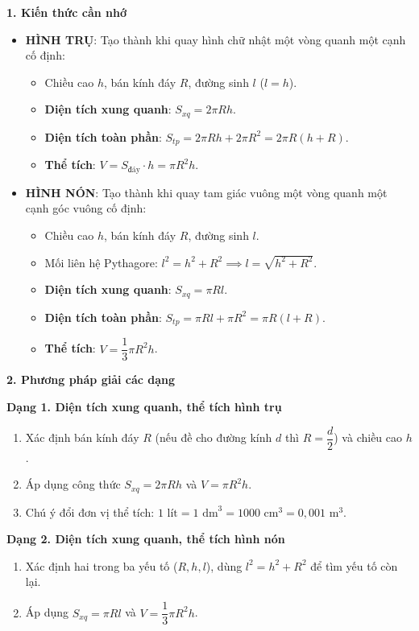 \textbf{1. Kiến thức cần nhớ}
\begin{itemize}
\item \textbf{HÌNH TRỤ}: Tạo thành khi quay hình chữ nhật một vòng quanh một cạnh cố định:
\begin{itemize}
\item Chiều cao $h$, bán kính đáy $R$, đường sinh $l$ ($l = h$).
\item \textbf{Diện tích xung quanh}: $\boxed{S_{xq} = 2\pi R h}$.
\item \textbf{Diện tích toàn phần}: $\boxed{S_{tp} = 2\pi R h + 2\pi R^2 = 2\pi R(h + R)}$.
\item \textbf{Thể tích}: $\boxed{V = S_{\text{đáy}} \cdot h = \pi R^2 h}$.
\end{itemize}
\item \textbf{HÌNH NÓN}: Tạo thành khi quay tam giác vuông một vòng quanh một cạnh góc vuông cố định:
\begin{itemize}
\item Chiều cao $h$, bán kính đáy $R$, đường sinh $l$.
\item Mối liên hệ Pythagore: $\boxed{l^2 = h^2 + R^2 \implies l = \sqrt{h^2 + R^2}}$.
\item \textbf{Diện tích xung quanh}: $\boxed{S_{xq} = \pi R l}$.
\item \textbf{Diện tích toàn phần}: $\boxed{S_{tp} = \pi R l + \pi R^2 = \pi R(l + R)}$.
\item \textbf{Thể tích}: $\boxed{V = \dfrac{1}{3} \pi R^2 h}$.
\end{itemize}
\end{itemize}

\textbf{2. Phương pháp giải các dạng}

\textbf{Dạng 1. Diện tích xung quanh, thể tích hình trụ}
\begin{enumerate}
\item Xác định bán kính đáy $R$ (nếu đề cho đường kính $d$ thì $R = \dfrac{d}{2}$) và chiều cao $h$.
\item Áp dụng công thức $S_{xq} = 2\pi R h$ và $V = \pi R^2 h$.
\item Chú ý đổi đơn vị thể tích: $1\text{ lít} = 1\text{ dm}^3 = 1000\text{ cm}^3 = 0{,}001\text{ m}^3$.
\end{enumerate}

\textbf{Dạng 2. Diện tích xung quanh, thể tích hình nón}
\begin{enumerate}
\item Xác định hai trong ba yếu tố ($R, h, l$), dùng $l^2 = h^2 + R^2$ để tìm yếu tố còn lại.
\item Áp dụng $S_{xq} = \pi R l$ và $V = \dfrac{1}{3}\pi R^2 h$.
\end{enumerate}

